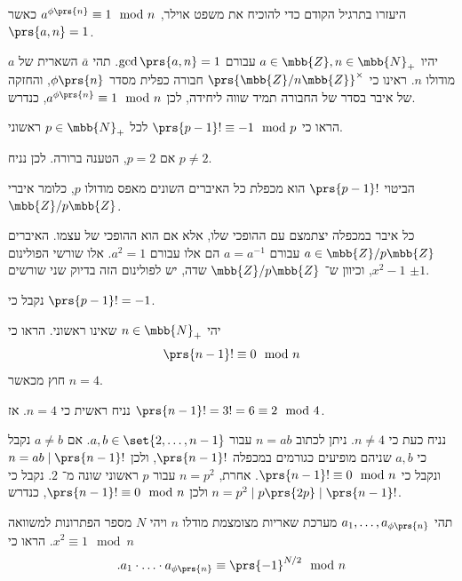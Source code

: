 \documentclass[a4paper,10pt,twoside,openany]{book}
\begin{document}
\begin{exercisechap}
היעזרו בתרגיל הקודם כדי להוכיח את משפט אוילר,
$a^{\phi\prs{n}} \equiv 1 \mod{n}$
כאשר
$\prs{a,n} = 1$.
\end{exercisechap}

\begin{solution}
יהיו
$a \in \mbb{Z}, n \in \mbb{N}_+$
עבורם
$\gcd\prs{a,n} = 1$.
תהי
$\bar{a}$
השארית של
$a$
מודולו
$n$.
ראינו כי
$\prs{\mbb{Z} / n\mbb{Z}}^\times$
חבורה כפלית מסדר
$\phi\prs{n}$,
והחזקה של איבר בסדר של החבורה תמיד שווה ליחידה, לכן
$a^{\phi\prs{n}} \equiv 1 \mod{n}$,
כנדרש.
\end{solution}

\begin{exercisechap}
הראו כי
$\prs{p-1}! \equiv -1 \mod{p}$
לכל
$p \in \mbb{N}_+$
ראשוני.
\end{exercisechap}

\begin{solution}
אם
$p = 2$,
הטענה ברורה. לכן נניח
$p \neq 2$.

הביטוי
$\prs{p-1}!$
הוא מכפלת כל האיברים השונים מאפס מודולו
$p$,
כלומר איברי
$\mbb{Z} / p\mbb{Z}$.

כל איבר במכפלה יצתמצם עם ההופכי שלו, אלא אם הוא ההופכי של עצמו.
האיברים
$a \in \mbb{Z} / p\mbb{Z}$
עבורם
$a = a^{-1}$
הם אלו עבורם
$a^2 = 1$.
אלו שורשי הפולינום
$x^2 - 1$,
וכיוון ש־%
$\mbb{Z} / p\mbb{Z}$
שדה, יש לפולינום הזה בדיוק שני שורשים
$\pm 1$.

נקבל כי
$\prs{p-1}! = -1$.
\end{solution}

\begin{exercisechap}
יהי
$n \in \mbb{N}_+$
שאינו ראשוני. הראו כי
\[\prs{n-1}! \equiv 0 \mod{n}\]
חוץ מכאשר
$n = 4$.
\end{exercisechap}

\begin{solution}
נניח ראשית כי
$n = 4$.
אז
$\prs{n-1}! = 3! = 6 \equiv 2 \mod{4}$.

נניח כעת כי
$n \neq 4$.
ניתן לכתוב
$n = ab$
עבור
$a,b \in \set{2, \ldots, n-1}$.
אם
$a \neq b$
נקבל כי
$a,b$
שניהם מופיעים כגורמים במכפלה
$\prs{n-1}!$,
ולכן
$n = ab \mid \prs{n-1}!$
ונקבל כי
$\prs{n-1}! \equiv 0 \mod{n}$.
אחרת,
$n = p^2$
עבור
$p$
ראשוני שונה מ־%
$2$.
נקבל כי
$n = p^2 \mid p \prs{2p} \mid \prs{n-1}!$
ולכן
$\prs{n-1}! \equiv 0 \mod{n}$,
כנדרש.
\end{solution}

\begin{exercisechap}
תהי
$a_1, \ldots, a_{\phi\prs{n}}$
מערכת שאריות מצומצמת מודלו
$n$
ויהי
$N$
מספר הפתרונות למשוואה
$x^2 \equiv 1 \mod{n}$.
הראו כי
\[\text{.} a_1 \cdot \ldots \cdot a_{\phi\prs{n}} \equiv \prs{-1}^{N/2} \mod{n}\]
\end{exercisechap}
\end{document}
